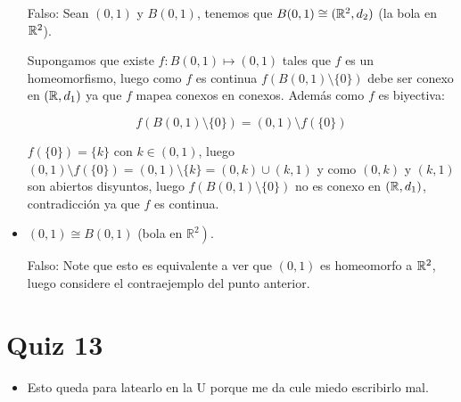 \begin{itemize}[label={✎},leftmargin=*]
Falso: Sean $(0,1)$ y $B(0,1)$, tenemos que $B(0,1)\cong (\mathbb{R}^2,d_2)$ (la bola en $\mathbb{R}^2$).

Supongamos que existe $f:B(0,1)\mapsto (0,1)$ tales que $f$ es un homeomorfismo, luego como $f$ es continua $f(B(0,1)\setminus\{0\})$ debe ser conexo en $(\mathbb{R},d_1)$ ya que $f$ mapea conexos en conexos. Además como $f$ es biyectiva:

$$f(B(0,1)\setminus\{0\})=(0,1)\setminus f(\{0\})$$

$f(\{0\})=\{k\}$ con $k\in (0,1)$, luego $(0,1)\setminus f(\{0\})=(0,1)\setminus \{k\}=(0,k)\cup (k,1)$ y como $(0,k)$ y $(k,1)$ son abiertos disyuntos, luego $f(B(0,1)\setminus\{0\})$ no es conexo en $(\mathbb{R},d_1)$, contradicción ya que $f$ es continua.

\item   $(0,1) \cong B(0,1)$ (bola en $\left.\mathbb{R}^2\right)$.

Falso: Note que esto es equivalente a ver que $(0,1)$ es homeomorfo a $\mathbb{R}^2$, luego considere el contraejemplo del punto anterior.
\end{itemize}



\section{Quiz 13}

\begin{itemize}[label={✎},leftmargin=*]
   
    \item Esto queda para latearlo en la U porque me da cule miedo escribirlo mal.

\end{itemize}


